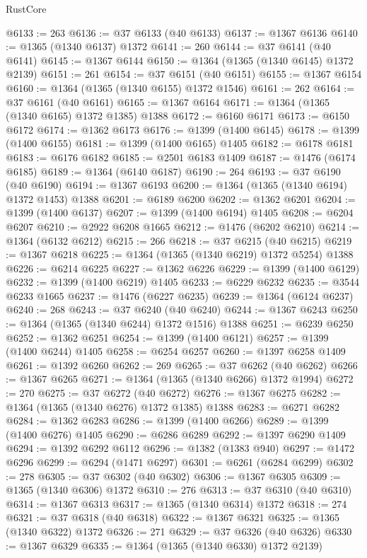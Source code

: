 \begin{lexlean}{RustCore}
\begin{coremodule}
@6133 := 263
@6136 := @37 @6133 (@40 @6133)
@6137 := @1367 @6136
@6140 := @1365 (@1340 @6137) @1372
@6141 := 260
@6144 := @37 @6141 (@40 @6141)
@6145 := @1367 @6144
@6150 := @1364 (@1365 (@1340 @6145) @1372 @2139)
@6151 := 261
@6154 := @37 @6151 (@40 @6151)
@6155 := @1367 @6154
@6160 := @1364 (@1365 (@1340 @6155) @1372 @1546)
@6161 := 262
@6164 := @37 @6161 (@40 @6161)
@6165 := @1367 @6164
@6171 := @1364 (@1365 (@1340 @6165) @1372 @1385) @1388
@6172 := @6160 @6171
@6173 := @6150 @6172
@6174 := @1362 @6173
@6176 := @1399 (@1400 @6145)
@6178 := @1399 (@1400 @6155)
@6181 := @1399 (@1400 @6165) @1405
@6182 := @6178 @6181
@6183 := @6176 @6182
@6185 := @2501 @6183 @1409
@6187 := @1476 (@6174 @6185)
@6189 := @1364 (@6140 @6187)
@6190 := 264
@6193 := @37 @6190 (@40 @6190)
@6194 := @1367 @6193
@6200 := @1364 (@1365 (@1340 @6194) @1372 @1453) @1388
@6201 := @6189 @6200
@6202 := @1362 @6201
@6204 := @1399 (@1400 @6137)
@6207 := @1399 (@1400 @6194) @1405
@6208 := @6204 @6207
@6210 := @2922 @6208 @1665
@6212 := @1476 (@6202 @6210)
@6214 := @1364 (@6132 @6212)
@6215 := 266
@6218 := @37 @6215 (@40 @6215)
@6219 := @1367 @6218
@6225 := @1364 (@1365 (@1340 @6219) @1372 @5254) @1388
@6226 := @6214 @6225
@6227 := @1362 @6226
@6229 := @1399 (@1400 @6129)
@6232 := @1399 (@1400 @6219) @1405
@6233 := @6229 @6232
@6235 := @3544 @6233 @1665
@6237 := @1476 (@6227 @6235)
@6239 := @1364 (@6124 @6237)
@6240 := 268
@6243 := @37 @6240 (@40 @6240)
@6244 := @1367 @6243
@6250 := @1364 (@1365 (@1340 @6244) @1372 @1516) @1388
@6251 := @6239 @6250
@6252 := @1362 @6251
@6254 := @1399 (@1400 @6121)
@6257 := @1399 (@1400 @6244) @1405
@6258 := @6254 @6257
@6260 := @1397 @6258 @1409
@6261 := @1392 @6260
@6262 := 269
@6265 := @37 @6262 (@40 @6262)
@6266 := @1367 @6265
@6271 := @1364 (@1365 (@1340 @6266) @1372 @1994)
@6272 := 270
@6275 := @37 @6272 (@40 @6272)
@6276 := @1367 @6275
@6282 := @1364 (@1365 (@1340 @6276) @1372 @1385) @1388
@6283 := @6271 @6282
@6284 := @1362 @6283
@6286 := @1399 (@1400 @6266)
@6289 := @1399 (@1400 @6276) @1405
@6290 := @6286 @6289
@6292 := @1397 @6290 @1409
@6294 := @1392 @6292 @6112
@6296 := @1382 (@1383 @940)
@6297 := @1472 @6296
@6299 := @6294 (@1471 @6297)
@6301 := @6261 (@6284 @6299)
@6302 := 278
@6305 := @37 @6302 (@40 @6302)
@6306 := @1367 @6305
@6309 := @1365 (@1340 @6306) @1372
@6310 := 276
@6313 := @37 @6310 (@40 @6310)
@6314 := @1367 @6313
@6317 := @1365 (@1340 @6314) @1372
@6318 := 274
@6321 := @37 @6318 (@40 @6318)
@6322 := @1367 @6321
@6325 := @1365 (@1340 @6322) @1372
@6326 := 271
@6329 := @37 @6326 (@40 @6326)
@6330 := @1367 @6329
@6335 := @1364 (@1365 (@1340 @6330) @1372 @2139)

\end{coremodule}
\end{lexlean}
